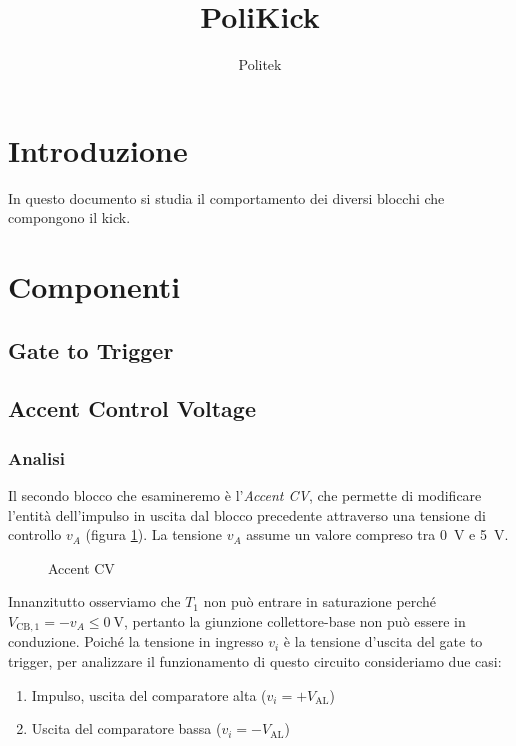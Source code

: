 \documentclass{article}
\title{PoliKick}
\author{Politek}
\newcommand{\var}[2]{#1_\mathrm{#2}}
\theoremstyle{definition}
\begin{document}
\maketitle


\tableofcontents


\section{Introduzione}
In questo documento si studia il comportamento dei diversi blocchi che compongono il kick.

\section{Componenti}

\subsection{Gate to Trigger}


\subsection{Accent Control Voltage}

\subsubsection{Analisi}

Il secondo blocco che esamineremo è l'\textit{Accent CV}, che permette di modificare l'entità dell'impulso in uscita dal blocco precedente attraverso una tensione di controllo \(v_A\)
(figura \ref{fig:accent-cv}).
La tensione \(v_A\) assume un valore compreso tra \qty{0}{\volt} e \qty{5}{\volt}.

\begin{figure}[ht]
    \centering
    
    \caption{Accent CV}
    \label{fig:accent-cv}
\end{figure}

Innanzitutto osserviamo che \(T_1\) non può entrare in saturazione perché \(\var{V}{CB,1} = -v_A \le \qty{0}{\volt}\), pertanto la giunzione collettore-base non può essere in conduzione.
Poiché la tensione in ingresso \(v_i\) è la tensione d'uscita del gate to trigger, per analizzare il funzionamento di questo circuito consideriamo due casi:

\begin{enumerate}
    \item Impulso, uscita del comparatore alta (\(v_i = +\var{V}{AL}\))
    \item Uscita del comparatore bassa (\(v_i = -\var{V}{AL}\))
\end{enumerate}
\end{document}

